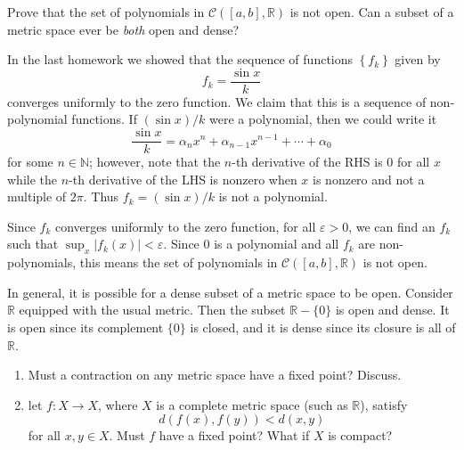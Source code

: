 \documentclass[10pt]{amsart}
\newenvironment{exercise}[1]{%
        \vspace{10mm}
        \renewcommand\themanualtheoreminner{#1}%
  \manualtheoreminner
}\hrulefill{\endmanualtheoreminner}
\begin{document}
\begin{exercise}{Page 286, Ex. 3}
	Prove that the set of polynomials in $\mathcal{C}([a,b], \mathbb{R})$ is not open. Can a subset of a metric space ever be \textit{both} open and dense?
\end{exercise}

In the last homework we showed that the sequence of functions $\left\{ f_k \right\}$ given by
\[
f_k = \frac{\sin x}{k} 
\] converges uniformly to the zero function. We claim that this is a sequence of non-polynomial functions. If $(\sin x)/ k$ were a polynomial, then we could write it
 \[
\frac{\sin x}{k} = \alpha_n x^n + \alpha_{n-1} x^{n-1} + \cdots + \alpha_0
\] for some $n \in \mathbb{N}$; however, note that the $n$-th derivative of the RHS is 0 for all $x$ while the $n$-th derivative of the LHS is nonzero when $x$ is nonzero and not a multiple of $2\pi$. Thus $f_k = (\sin x)/k$ is not a polynomial.

Since $f_k$ converges uniformly to the zero function, for all $\varepsilon > 0$, we can find an $f_k$ such that $\sup_x |f_k(x)| < \varepsilon$. Since $0$ is a polynomial and all $f_k$ are non-polynomials, this means the set of polynomials in $\mathcal{C}([a,b], \mathbb{R})$ is not open.

In general, it is possible for a dense subset of a metric space to be open. Consider $\mathbb{R}$ equipped with the usual metric. Then the subset $\mathbb{R} - \{0\}$ is open and dense. It is open since its complement $\{0\}$ is closed, and it is dense since its closure is all of $\mathbb{R}$.

\begin{exercise}{Page 317, Ex. 11}
	\begin{enumerate}
		\item Must a contraction on any metric space have a fixed point? Discuss.
		\item let $f:X \to X$, where $X$ is a complete metric space (such as $\mathbb{R}$), satisfy \[d(f(x), f(y)) < d(x,y)\] for all $x,y \in X$. Must $f$ have a fixed point? What if $X$ is compact?
	\end{enumerate}
\end{exercise}
\end{document}

